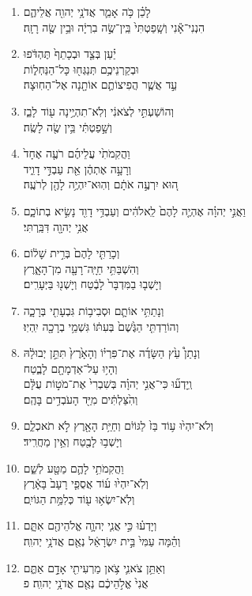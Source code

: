 \documentclass[12pt,a4paper,titlepage]{article}
\def \pscolor{red} %
\def \pslabelsep{0.2em} %
\def \psleftmargin{0em} %
\begin{document}
\begin{hebrew}
\begin{enumerate}[leftmargin=\psleftmargin, labelsep=\pslabelsep, label=\fontspec{Linux Libertine}\arabic*, font=\color{\pscolor}\small\textsuperscript, parsep=0em, itemsep=0em, topsep=0em]
            \item לָכֵ֗ן כֹּ֥ה אָמַ֛ר אֲדֹנָ֥י יְהוִ֖ה אֲלֵיהֶ֑ם \\ הִנְנִי־אָ֕נִי וְשָֽׁפַטְתִּי֙ בֵּֽין־שֶׂ֣ה בִרְיָ֔ה וּבֵ֥ין שֶׂ֖ה רָזָֽה׃
            \item יַ֗עַן בְּצַ֤ד וּבְכָתֵף֙ תֶּהְדֹּ֔פוּ \\ וּבְקַרְנֵיכֶ֥ם תְּנַגְּח֖וּ כָּל־הַנַּחְל֑וֹת \\ עַ֣ד אֲשֶׁ֧ר הֲפִיצוֹתֶ֛ם אוֹתָ֖נָה אֶל־הַחֽוּצָה׃
            \item וְהוֹשַׁעְתִּ֣י לְצֹאנִ֔י וְלֹֽא־תִהְיֶ֥ינָה ע֖וֹד לָבַ֑ז \\ וְשָׁ֣פַטְתִּ֔י בֵּ֥ין שֶׂ֖ה לָשֶֽׂה׃
            \item וַהֲקִמֹתִ֙י עֲלֵיהֶ֜ם רֹעֶ֤ה אֶחָד֙ \\ וְרָעָ֣ה אֶתְהֶ֔ן אֵ֖ת עַבְדִּ֣י דָוִ֑יד \\ ה֚וּא יִרְעֶ֣ה אֹתָ֔ם וְהֽוּא־יִהְיֶ֥ה לָהֶ֖ן לְרֹעֶֽה׃
            \item וַאֲנִ֣י יְהוָ֗ה אֶהְיֶ֤ה לָהֶם֙ לֵֽאלֹהִ֔ים וְעַבְדִּ֥י דָוִ֖ד נָשִׂ֣יא בְתוֹכָ֑ם \\ אֲנִ֥י יְהוָ֖ה דִּבַּֽרְתִּי׃
            \item וְכָרַתִּ֤י לָהֶם֙ בְּרִ֣ית שָׁל֔וֹם \\ וְהִשְׁבַּתִּ֥י חַיָּֽה־רָעָ֖ה מִן־הָאָ֑רֶץ \\ וְיָשְׁב֤וּ בַמִּדְבָּר֙ לָבֶ֔טַח וְיָשְׁנ֖וּ בַּיְּעָרִֽים׃
            \item וְנָתַתִּ֥י אוֹתָ֛ם וּסְבִיב֥וֹת גִּבְעָתִ֖י בְּרָכָ֑ה \\ וְהוֹרַדְתִּ֤י הַגֶּ֙שֶׁם֙ בְּעִתּ֔וֹ גִּשְׁמֵ֥י בְרָכָ֖ה יִֽהְיֽוּ׃
            \item וְנָתַן֩ עֵ֙ץ הַשָּׂדֶ֜ה אֶת־פִּרְי֗וֹ וְהָאָ֙רֶץ֙ תִּתֵּ֣ן יְבוּלָ֔הּ \\ וְהָי֥וּ עַל־אַדְמָתָ֖ם לָבֶ֑טַח \\ וְֽיָדְע֞וּ כִּי־אֲנִ֣י יְהוָ֗ה בְּשִׁבְרִי֙ אֶת־מֹט֣וֹת עֻלָּ֔ם \\ וְהִ֙צַּלְתִּ֔ים מִיַּ֖ד הָעֹבְדִ֥ים בָּהֶֽם׃
            \item וְלֹא־יִהְי֙וּ ע֥וֹד בַּז֙ לַגּוֹיִ֔ם וְחַיַּ֥ת הָאָ֖רֶץ לֹ֣א תֹאכְלֵ֑ם \\ וְיָשְׁב֥וּ לָבֶ֖טַח וְאֵ֥ין מַחֲרִֽיד׃
            \item וַהֲקִמֹתִ֥י לָהֶ֛ם מַטָּ֖ע לְשֵׁ֑ם \\ וְלֹֽא־יִהְי֙וּ ע֜וֹד אֲסֻפֵ֤י רָעָב֙ בָּאָ֔רֶץ \\ וְלֹֽא־יִשְׂא֥וּ ע֖וֹד כְּלִמַּ֥ת הַגּוֹיִֽם׃
            \item וְיָדְע֗וּ כִּ֣י אֲנִ֧י יְהוָ֛ה אֱלֹהֵיהֶ֖ם אִתָּ֑ם \\ וְהֵ֗מָּה עַמִּי֙ בֵּ֣ית יִשְׂרָאֵ֔ל נְאֻ֖ם אֲדֹנָ֥י יְהוִֽה׃
            \item וְאַתֵּ֥ן צֹאנִ֛י צֹ֥אן מַרְעִיתִ֖י אָדָ֣ם אַתֶּ֑ם \\ אֲנִי֙ אֱלֹ֣הֵיכֶ֔ם נְאֻ֖ם אֲדֹנָ֥י יְהוִֽה׃ פ
      \end{enumerate}
      \newpage


\end{hebrew}
\end{document}
